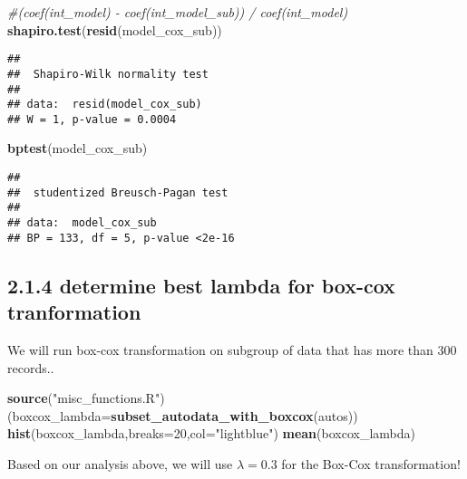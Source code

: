 \documentclass[]{article}
\newenvironment{Shaded}{\begin{snugshade}}{\end{snugshade}}
\newcommand{\CommentTok}[1]{\textcolor[rgb]{0.56,0.35,0.01}{\textit{#1}}}
\newcommand{\DataTypeTok}[1]{\textcolor[rgb]{0.13,0.29,0.53}{#1}}
\newcommand{\DecValTok}[1]{\textcolor[rgb]{0.00,0.00,0.81}{#1}}
\newcommand{\FloatTok}[1]{\textcolor[rgb]{0.00,0.00,0.81}{#1}}
\newcommand{\KeywordTok}[1]{\textcolor[rgb]{0.13,0.29,0.53}{\textbf{#1}}}
\newcommand{\NormalTok}[1]{#1}
\newcommand{\OperatorTok}[1]{\textcolor[rgb]{0.81,0.36,0.00}{\textbf{#1}}}
\newcommand{\StringTok}[1]{\textcolor[rgb]{0.31,0.60,0.02}{#1}}
\begin{document}
\begin{Shaded}
\begin{Highlighting}[]
\CommentTok{#(coef(int_model) - coef(int_model_sub)) / coef(int_model)}
\KeywordTok{shapiro.test}\NormalTok{(}\KeywordTok{resid}\NormalTok{(model_cox_sub))}
\end{Highlighting}
\end{Shaded}

\begin{verbatim}
## 
##  Shapiro-Wilk normality test
## 
## data:  resid(model_cox_sub)
## W = 1, p-value = 0.0004
\end{verbatim}

\begin{Shaded}
\begin{Highlighting}[]
\KeywordTok{bptest}\NormalTok{(model_cox_sub)}
\end{Highlighting}
\end{Shaded}

\begin{verbatim}
## 
##  studentized Breusch-Pagan test
## 
## data:  model_cox_sub
## BP = 133, df = 5, p-value <2e-16
\end{verbatim}

\hypertarget{determine-best-lambda-for-box-cox-tranformation}{%
\subsection{2.1.4 determine best lambda for box-cox
tranformation}\label{determine-best-lambda-for-box-cox-tranformation}}

We will run box-cox transformation on subgroup of data that has more
than 300 records..

\begin{Shaded}
\begin{Highlighting}[]
\KeywordTok{source}\NormalTok{(}\StringTok{"misc_functions.R"}\NormalTok{)}
\NormalTok{(}\DataTypeTok{boxcox_lambda=}\KeywordTok{subset_autodata_with_boxcox}\NormalTok{(autos))}
\KeywordTok{hist}\NormalTok{(boxcox_lambda,}\DataTypeTok{breaks=}\DecValTok{20}\NormalTok{,}\DataTypeTok{col=}\StringTok{"lightblue"}\NormalTok{)}
\KeywordTok{mean}\NormalTok{(boxcox_lambda)}
\end{Highlighting}
\end{Shaded}

Based on our analysis above, we will use \(\lambda=0.3\) for the Box-Cox
transformation!

\begin{Shaded}
\end{Shaded}
\end{document}
